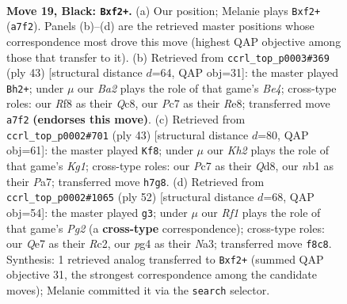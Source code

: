 \documentclass[11pt]{article}
\begin{document}
\clearpage

\begin{figure}[p]\centering
\begin{subfigure}{0.46\textwidth}\centering
\resizebox{\linewidth}{!}{%
\newchessgame
\chessboard[
  setfen={r4r2/b1p1qp1k/R1p4p/4p1pQ/4P1P1/2PP4/5P2/1NB2RK1 b - - 0 19},
  showmover=false,
  pgfstyle=straightmove, color=movearrow, markmove={a7-f2}
]}
\caption{}
\end{subfigure}\hfill
\begin{subfigure}{0.46\textwidth}\centering
\resizebox{\linewidth}{!}{%
\newchessgame
\chessboard[
  setfen={2q1r1k1/5p1p/r1p3p1/p1P1b3/Q2p4/7P/PP1BRPP1/R5K1 b - - 3 22},
  showmover=false,
  pgfstyle=straightmove, color=movearrow, markmove={e5-h2}
]}
\caption{}
\end{subfigure}
\\[4pt]
\begin{subfigure}{0.46\textwidth}\centering
\resizebox{\linewidth}{!}{%
\newchessgame
\chessboard[
  setfen={r2q2k1/pb3p2/1p3r2/2p3Q1/3p2P1/P7/1P2PP1P/2R1KBR1 b - - 2 22},
  showmover=false,
  pgfstyle=straightmove, color=movearrow, markmove={g8-f8}
]}
\caption{}
\end{subfigure}\hfill
\begin{subfigure}{0.46\textwidth}\centering
\resizebox{\linewidth}{!}{%
\newchessgame
\chessboard[
  setfen={2r3k1/5p2/1q1p1npb/3Pp2p/pP2P3/N1BQ3P/2R2PP1/6K1 w - - 7 27},
  showmover=false,
  pgfstyle=straightmove, color=movearrow, markmove={g2-g3}
]}
\caption{}
\end{subfigure}
\caption{\textbf{Move 19, Black: \texttt{Bxf2+}.} (a) Our position; Melanie plays \texttt{Bxf2+} (\texttt{a7f2}). Panels (b)--(d) are the retrieved master positions whose correspondence most drove this move (highest QAP objective among those that transfer to it). (b) Retrieved from \texttt{ccrl\_top\_p0003\#369} (ply 43) [structural distance $d$=64, QAP obj=31]: the master played \texttt{Bh2+}; under $\mu$ our \emph{Ba2} plays the role of that game's \emph{Be4}; cross-type roles: our \emph{R}f8 as their \emph{Q}c8, our \emph{P}c7 as their \emph{R}e8; transferred move \texttt{a7f2} \textbf{(endorses this move)}. (c) Retrieved from \texttt{ccrl\_top\_p0002\#701} (ply 43) [structural distance $d$=80, QAP obj=61]: the master played \texttt{Kf8}; under $\mu$ our \emph{Kh2} plays the role of that game's \emph{Kg1}; cross-type roles: our \emph{P}c7 as their \emph{Q}d8, our \emph{n}b1 as their \emph{P}a7; transferred move \texttt{h7g8}. (d) Retrieved from \texttt{ccrl\_top\_p0002\#1065} (ply 52) [structural distance $d$=68, QAP obj=54]: the master played \texttt{g3}; under $\mu$ our \emph{Rf1} plays the role of that game's \emph{Pg2} (a \textbf{cross-type} correspondence); cross-type roles: our \emph{Q}e7 as their \emph{R}c2, our \emph{p}g4 as their \emph{N}a3; transferred move \texttt{f8c8}. Synthesis: 1 retrieved analog transferred to \texttt{Bxf2+} (summed QAP objective 31, the strongest correspondence among the candidate moves); Melanie committed it via the \texttt{search} selector.}
\label{fig:thought-m37}
\end{figure}
\end{document}
